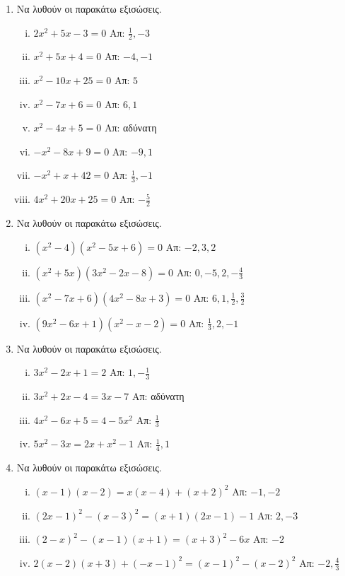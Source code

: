 \begin{enumerate}
  \item  Να λυθούν οι παρακάτω εξισώσεις.
    \begin{enumerate}[i)]
      \item $ 2x^{2} + 5x - 3 = 0 $ \hfill  Απ: $ \frac{1}{2}, -3 $ 
      \item $ x^{2} + 5x + 4 = 0 $ \hfill Απ:  $ -4, -1 $
      \item $ x^{2} - 10x + 25 = 0 $ \hfill Απ: $ 5 $
      \item $ x^{2} - 7x + 6 = 0 $ \hfill Απ: $ 6, 1 $
      \item $ x^{2} - 4x + 5 = 0 $ \hfill Απ:  αδύνατη
      \item $ -x^{2} - 8x + 9 = 0 $ \hfill Απ: $ -9, 1 $
      \item $ -x^{2} + x + 42 = 0 $ \hfill Απ: $ \frac{1}{3}, -1 $  
      \item $ 4x^{2} + 20x + 25 = 0 $ \hfill Απ: $ - \frac{5}{2} $ 
    \end{enumerate}

  \item Να λυθούν οι παρακάτω εξισώσεις.
    \begin{enumerate}[i)]
      \item $ (x^{2} - 4)(x^{2} - 5x + 6) = 0 $ \hfill Απ: $ -2, 3, 2 $ 
      \item $ (x^{2} + 5x)(3x^{2} - 2x - 8) = 0 $ \hfill Απ: $ 0, -5, 2, -\frac{4}{3} $
      \item $ (x^{2} - 7x + 6)(4x^{2}- 8x + 3) = 0 $ \hfill Απ: $ 6, 1, \frac{1}{2},
        \frac{3}{2} $
      \item $ (9x^{2} - 6x + 1)(x^{2} - x - 2) = 0 $ \hfill Απ: $ \frac{1}{3}, 2, -1  $ 

    \end{enumerate}

  \item Να λυθούν οι παρακάτω εξισώσεις.
    \begin{enumerate}[i)]
      \item $ 3x^{2} - 2x + 1 = 2 $ \hfill Απ: $ 1, - \frac{1}{3} $  
      \item $ 3x^{2} + 2x - 4 = 3x - 7 $ \hfill Απ:  αδύνατη
      \item $ 4x^{2} - 6x + 5 = 4 - 5x^{2} $ \hfill Απ: $ \frac{1}{3} $
      \item $ 5x^{2} - 3x = 2x + x^{2} - 1 $ \hfill Απ: $ \frac{1}{4}, 1 $ 
    \end{enumerate}

  \item Να λυθούν οι παρακάτω εξισώσεις.
    \begin{enumerate}[i)]
      \item $ (x-1)(x-2) = x(x-4)+(x+2)^{2} $ \hfill Απ: $ -1, -2 $
      \item $ (2x-1)^{2} - (x-3)^{2} = (x+1)(2x-1) - 1 $ \hfill Απ: $ 2, -3 $
      \item $ (2-x)^{2} - (x-1)(x+1) = (x+3)^{2} - 6x $ \hfill Απ: $ -2 $
      \item $ 2(x-2)(x+3) + (-x-1)^{2} = (x-1)^{2} - (x-2)^{2} $ \hfill Απ: $ -2,
        \frac{4}{3} $ 
    \end{enumerate}


\end{enumerate}
